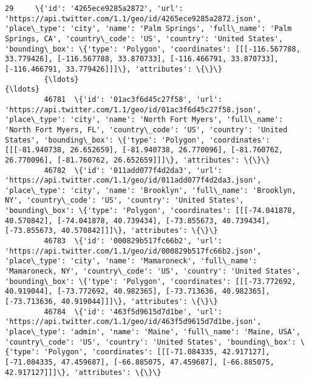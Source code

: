 \documentclass[11pt]{article}
\begin{document}
\begin{Verbatim}[commandchars=\\\{\}]
         29     \{'id': '4265ece9285a2872', 'url': 'https://api.twitter.com/1.1/geo/id/4265ece9285a2872.json', 'place\_type': 'city', 'name': 'Palm Springs', 'full\_name': 'Palm Springs, CA', 'country\_code': 'US', 'country': 'United States', 'bounding\_box': \{'type': 'Polygon', 'coordinates': [[[-116.567788, 33.779426], [-116.567788, 33.870733], [-116.466791, 33.870733], [-116.466791, 33.779426]]]\}, 'attributes': \{\}\}           
         {\ldots}                                                                                                                                                                                                                                                                                                                                                                                                                 {\ldots}           
         46781  \{'id': '01ac3f6d45c27f58', 'url': 'https://api.twitter.com/1.1/geo/id/01ac3f6d45c27f58.json', 'place\_type': 'city', 'name': 'North Fort Myers', 'full\_name': 'North Fort Myers, FL', 'country\_code': 'US', 'country': 'United States', 'bounding\_box': \{'type': 'Polygon', 'coordinates': [[[-81.940738, 26.652659], [-81.940738, 26.770096], [-81.760762, 26.770096], [-81.760762, 26.652659]]]\}, 'attributes': \{\}\}       
         46782  \{'id': '011add077f4d2da3', 'url': 'https://api.twitter.com/1.1/geo/id/011add077f4d2da3.json', 'place\_type': 'city', 'name': 'Brooklyn', 'full\_name': 'Brooklyn, NY', 'country\_code': 'US', 'country': 'United States', 'bounding\_box': \{'type': 'Polygon', 'coordinates': [[[-74.041878, 40.570842], [-74.041878, 40.739434], [-73.855673, 40.739434], [-73.855673, 40.570842]]]\}, 'attributes': \{\}\}                       
         46783  \{'id': '000829b517fc66b2', 'url': 'https://api.twitter.com/1.1/geo/id/000829b517fc66b2.json', 'place\_type': 'city', 'name': 'Mamaroneck', 'full\_name': 'Mamaroneck, NY', 'country\_code': 'US', 'country': 'United States', 'bounding\_box': \{'type': 'Polygon', 'coordinates': [[[-73.772692, 40.919044], [-73.772692, 40.982365], [-73.713636, 40.982365], [-73.713636, 40.919044]]]\}, 'attributes': \{\}\}                   
         46784  \{'id': '463f5d9615d7d1be', 'url': 'https://api.twitter.com/1.1/geo/id/463f5d9615d7d1be.json', 'place\_type': 'admin', 'name': 'Maine', 'full\_name': 'Maine, USA', 'country\_code': 'US', 'country': 'United States', 'bounding\_box': \{'type': 'Polygon', 'coordinates': [[[-71.084335, 42.917127], [-71.084335, 47.459687], [-66.885075, 47.459687], [-66.885075, 42.917127]]]\}, 'attributes': \{\}\}                           

\end{Verbatim}
\end{document}
